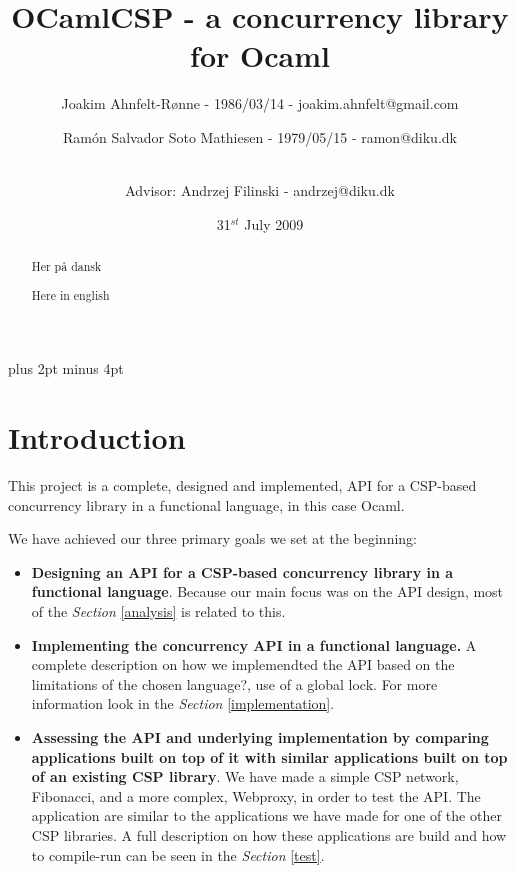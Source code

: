 \documentclass[a4paper,12pt]{article}
\title{OCamlCSP - a concurrency library for Ocaml}
\author{Joakim Ahnfelt-Rønne - 1986/03/14 - joakim.ahnfelt@gmail.com \and 
        Ramón Salvador Soto Mathiesen - 1979/05/15 - ramon@diku.dk \and
        \\ Advisor: Andrzej Filinski - andrzej@diku.dk}
\date{31$^{st}$ July 2009}
\begin{document}
\maketitle

\newpage
{}
\begin{abstract}
Her på dansk
\end{abstract}

\newpage
{}
\begin{abstract}
Here in english
\end{abstract}

\newpage
\tableofcontents
\newpage

\parindent=0pt
\parskip=8pt plus 2pt minus 4pt

\section{Introduction}
This project is a complete, designed and implemented, API for a CSP-based
concurrency library in a functional language, in this case Ocaml\cite{?}.

We have achieved our three primary goals we set at the beginning:
\begin{itemize}
 \item \textbf{Designing an API for a CSP-based concurrency library in a
     functional language}. Because our main focus was on the API design, most of
   the {\it Section} \ref{analysis} is related to this.
 \item \textbf{Implementing the concurrency API in a functional language.} A
   complete description on how we implemendted the API based on the limitations
   of the chosen language?, use of a global lock. For more information look in
   the {\it Section} \ref{implementation}.
 \item \textbf{Assessing the API and underlying implementation by comparing
     applications built on top of it with similar applications built on top of
     an existing CSP library}. We have made a simple CSP network, Fibonacci,
   and a more complex, Webproxy, in order to test the API. The application are
   similar to the applications we have made for one of the other CSP libraries.
   A full description on how these applications are build and how to compile-run
   can be seen in the {\it Section} \ref{test}.
\end{itemize}
\end{document}
